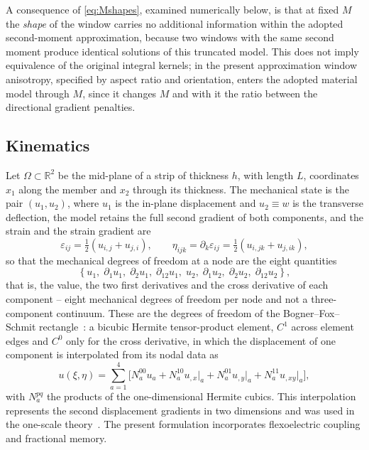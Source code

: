 A consequence of \eqref{eq:Mshapes}, examined numerically below, is that at fixed $M$ the
\emph{shape} of the window carries no additional information within the
adopted second-moment approximation, because two windows with the same second
moment produce identical solutions of this truncated model. This does not imply
equivalence of the original integral kernels; in the present approximation window anisotropy, specified by aspect ratio and orientation, enters
the adopted material model through $M$, since it
changes $M$ and with it the ratio between the directional gradient penalties.

\FloatBarrier
\subsection{Kinematics}
\label{sec:kinematics}

Let $\Omega\subset\mathbb{R}^2$ be the mid-plane of a strip of thickness $h$,
with length $L$, coordinates $x_1$ along the member and $x_2$ through its thickness. The
mechanical state is the pair $(u_1,u_2)$, where $u_1$ is the in-plane
displacement and $u_2\equiv w$ is the transverse deflection, the model retains
the full second gradient of both components, and the strain and the strain
gradient are
\begin{equation}
  \varepsilon_{ij} = \tfrac12\left(u_{i,j}+u_{j,i}\right),\qquad
  \eta_{ijk} = \partial_k \varepsilon_{ij} = \tfrac12\left(
  u_{i,jk}+u_{j,ik}\right),
  \label{eq:strain}
\end{equation}
so that the mechanical degrees of freedom at a node are the eight quantities
\begin{equation}
  \left\{u_1,\; \partial_1u_1,\; \partial_2u_1,\; \partial_{12}u_1,\;
         u_2,\; \partial_1u_2,\; \partial_2u_2,\; \partial_{12}u_2\right\},
  \label{eq:dofs}
\end{equation}
that is, the value, the two first derivatives and the cross derivative of each
component -- eight mechanical degrees of freedom per node and not a
three-component continuum. These are the degrees of freedom of the
Bogner--Fox--Schmit rectangle~\cite{BognerFoxSchmit1966}: a bicubic Hermite
tensor-product element, $C^1$ across element edges and $C^0$ only for the
cross derivative, in which the displacement of one component is interpolated
from its nodal data as
\begin{equation}
  u(\xi,\eta) = \sum_{a=1}^{4}\Big[N^{00}_{a}u_a + N^{10}_{a}u_{,x}\big|_a
    + N^{01}_{a}u_{,y}\big|_a + N^{11}_{a}u_{,xy}\big|_a\Big],
  \label{eq:interp}
\end{equation}
with $N^{pq}_a$ the products of the one-dimensional Hermite cubics. This interpolation represents the second displacement gradients in two
dimensions and was used in the one-scale theory~\cite{fem1}. The present
formulation incorporates flexoelectric coupling and fractional memory.

